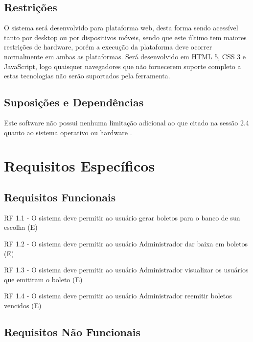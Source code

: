 \documentclass[12pt,a4paper,onecolumn,titlepage]{article}
\begin{document}
\subsection{Restrições}

O sistema será desenvolvido para plataforma web, desta forma sendo acessível tanto por desktop ou por dispositivos móveis, sendo que este último tem maiores restrições de hardware, porém a execução da plataforma deve ocorrer
normalmente em ambas as plataformas. Será desenvolvido em HTML 5, CSS 3 e JavaScript, logo quaisquer navegadores que não fornecerem suporte completo a estas tecnologias não serão suportados pela ferramenta.\\

\subsection{Suposições e Dependências}

Este software não possui nenhuma limitação adicional ao que citado na sessão 2.4 quanto ao sistema operativo ou hardware .

\section{Requisitos Específicos}
\label{sect:requisitos}

\subsection{Requisitos Funcionais}

\begin{description} 


\item	RF 1.1 - O sistema deve permitir ao usuário gerar boletos para o banco de sua escolha (E)
\item	RF 1.2 - O sistema deve permitir ao usuário Administrador dar baixa em boletos (E)
\item	RF 1.3 - O sistema deve permitir ao usuário Administrador visualizar os usuários que emitiram o boleto (E)
\item	RF 1.4 - O sistema deve permitir ao usuário Administrador reemitir boletos vencidos (E)

\end{description}

\subsection{Requisitos Não Funcionais}
\end{document}
